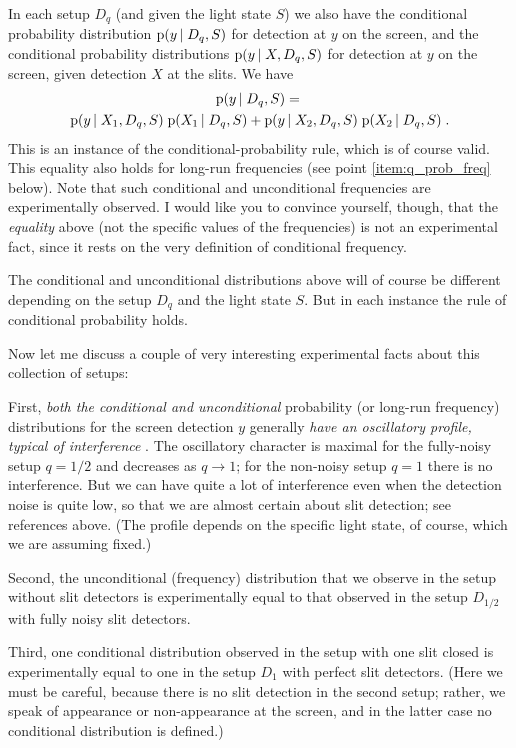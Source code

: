 \documentclass[\ifafour a4paper,12pt,\else a5paper,10pt,\fi%
onecolumn,oneside,article,%
british%
]{memoir}
\theoremstyle{remark}
\theoremstyle{innote}
\newcommand*{\citep}{\parencites}%
\newcommand*{\pf}{\mathrm{p}}%
\renewcommand*{\|}[1][]{\nonscript\,#1\vert\nonscript\;\mathopen{}}
\newcommand*{\yxa}{X_{1}}
\newcommand*{\yxb}{X_{2}}
\newcommand*{\yDq}{D_{q}}
\begin{document}
In each setup $\yDq$ (and given the light state $S$) we also have the
conditional probability distribution $\pf(y \| \yDq,S)$ for detection at
$y$ on the screen, and the conditional probability distributions
$\pf(y \| X,\yDq,S)$ for detection at $y$ on the screen, given detection
$X$ at the slits. We have
\begin{multline}
  \label{eq:conditional_q}
  \pf(y \| \yDq, S) ={}\\
  \pf(y \| \yxa, \yDq, S) \;\pf( \yxa \| \yDq, S) +
  \pf(y \| \yxb, \yDq, S) \;\pf( \yxb \| \yDq, S) \;.
\end{multline}
This is an instance of the conditional-probability rule, which is of course
valid. This equality also holds for long-run frequencies (see point
\ref{item:q_prob_freq} below). Note that such conditional and unconditional
frequencies are experimentally observed. I would like you to convince
yourself, though, that the \emph{equality} above (not the specific values
of the frequencies) is not an experimental fact, since it rests on the very
definition of conditional frequency.

The conditional and unconditional distributions above will of course be
different depending on the setup $\yDq$ and the light state $S$. But in
each instance the rule of conditional probability holds.

\medskip

Now let me discuss a couple of very interesting experimental facts about
this collection of setups:

First, \emph{both the conditional and unconditional} probability (or
long-run frequency) distributions for the screen detection $y$ generally
\emph{have an oscillatory profile, typical of interference}
\citep{woottersetal1979,banaszeketal2013}[see also][for further
variations]{chiaoetal1995}. The oscillatory character is maximal for the
fully-noisy setup $q=1/2$ and decreases as $q \to 1$; for the non-noisy
setup $q=1$ there is no interference. But we can have quite a lot of
interference even when the detection noise is quite low, so that we are
almost certain about slit detection; see references above. (The profile
depends on the specific light state, of course, which we are assuming
fixed.)
  
Second, the unconditional (frequency) distribution that we observe in the
setup without slit detectors is experimentally equal to that observed in
the setup $D_{1/2}$ with fully noisy slit detectors.

Third, one conditional distribution observed in the setup with one slit
closed is experimentally equal to one in the setup $D_{1}$ with perfect
slit detectors. (Here we must be careful, because there is no slit
detection in the second setup; rather, we speak of appearance or
non-appearance at the screen, and in the latter case no conditional
distribution is defined.)
\end{document}
